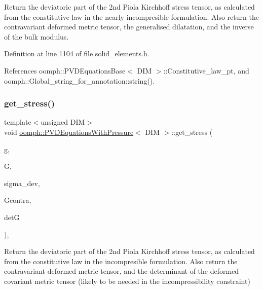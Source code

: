 Return the deviatoric part of the 2nd Piola Kirchhoff stress tensor, as calculated from the constitutive law in the nearly incompresible formulation. Also return the contravariant deformed metric tensor, the generalised dilatation, and the inverse of the bulk modulus. 



Definition at line 1104 of file solid\+\_\+elements.\+h.



References oomph\+::\+P\+V\+D\+Equations\+Base$<$ D\+I\+M $>$\+::\+Constitutive\+\_\+law\+\_\+pt, and oomph\+::\+Global\+\_\+string\+\_\+for\+\_\+annotation\+::string().

\mbox{\label{classoomph_1_1PVDEquationsWithPressure_a2fb01dcbdef6214a04b89485c9142dc8}} 
\subsubsection{\texorpdfstring{get\+\_\+stress()}{get\_stress()}\hspace{0.1cm}{\footnotesize\ttfamily [3/3]}}
{\footnotesize\ttfamily template$<$unsigned D\+IM$>$ \\
void \hyperlink{classoomph_1_1PVDEquationsWithPressure}{oomph\+::\+P\+V\+D\+Equations\+With\+Pressure}$<$ D\+IM $>$\+::get\+\_\+stress (\begin{DoxyParamCaption}\item[{const \hyperlink{classoomph_1_1DenseMatrix}{Dense\+Matrix}$<$ double $>$ \&}]{g,  }\item[{const \hyperlink{classoomph_1_1DenseMatrix}{Dense\+Matrix}$<$ double $>$ \&}]{G,  }\item[{\hyperlink{classoomph_1_1DenseMatrix}{Dense\+Matrix}$<$ double $>$ \&}]{sigma\+\_\+dev,  }\item[{\hyperlink{classoomph_1_1DenseMatrix}{Dense\+Matrix}$<$ double $>$ \&}]{Gcontra,  }\item[{double \&}]{detG }\end{DoxyParamCaption})\hspace{0.3cm}{\ttfamily [inline]}, {\ttfamily [protected]}}



Return the deviatoric part of the 2nd Piola Kirchhoff stress tensor, as calculated from the constitutive law in the incompresible formulation. Also return the contravariant deformed metric tensor, and the determinant of the deformed covariant metric tensor (likely to be needed in the incompressibility constraint) 



